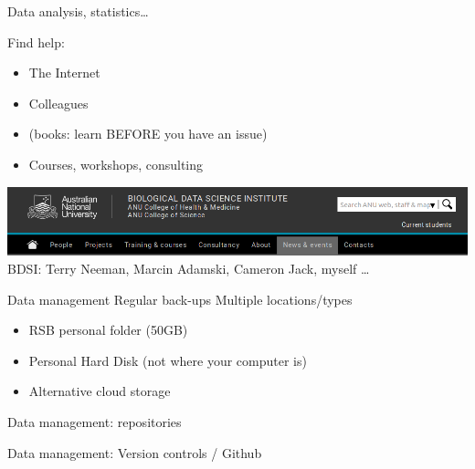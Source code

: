 \documentclass[10pt]{beamer}%
\begin{document}
\begin{frame}{Data analysis, statistics\dots }
    \begin{block}{Find help:}
        \begin{itemize}
         \item The Internet
         \item Colleagues
         \item (books: learn BEFORE you have an issue)
         \item Courses, workshops, consulting
        \end{itemize}
    
    \includegraphics[width=\textwidth]{Figures/bdsi}
    BDSI: Terry Neeman, Marcin Adamski, Cameron Jack, myself \dots
    \end{block}

\end{frame}

\begin{frame}{Data management}
\alert{Regular back-ups} \hfill \alert{Multiple locations/types}

\begin{itemize}
 \item  RSB personal folder (50GB)
    \item Personal Hard Disk (not where your computer is)
\item Alternative cloud storage
\end{itemize}

\end{frame}


\begin{frame}{Data management: repositories}
\end{frame}

\begin{frame}{Data management: Version controls / Github}
\end{frame}
\end{document}
